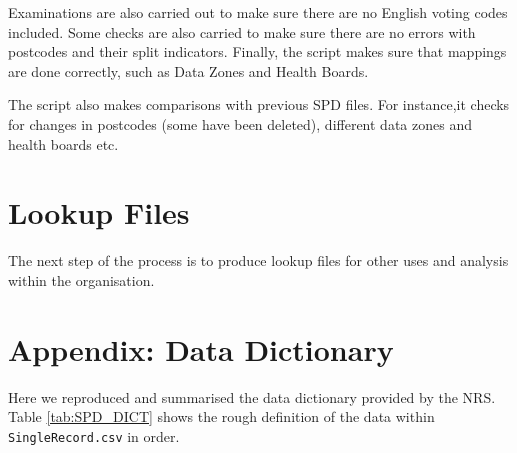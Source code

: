 \documentclass[12pt]{article}
\begin{document}
Examinations are also
carried out to make sure there are no English voting codes included. Some checks are also carried to make sure
there are no errors with postcodes and their
split indicators.
Finally, the script makes sure that mappings are done correctly,
such as Data Zones and Health Boards.

The script also makes comparisons with previous SPD files.
For instance,it checks for changes in postcodes
(some have been deleted), different data zones and
health boards etc.

 
\section{Lookup Files}
The next step of the process is to produce lookup files for
other uses and analysis within the organisation.



\appendix
\section{Appendix: Data Dictionary}\label{appendix:dict}
Here we reproduced and summarised the data dictionary provided by the NRS. Table {\ref{tab:SPD_DICT}} shows the rough definition of the data within \texttt{SingleRecord.csv}
in order.
\end{document}
